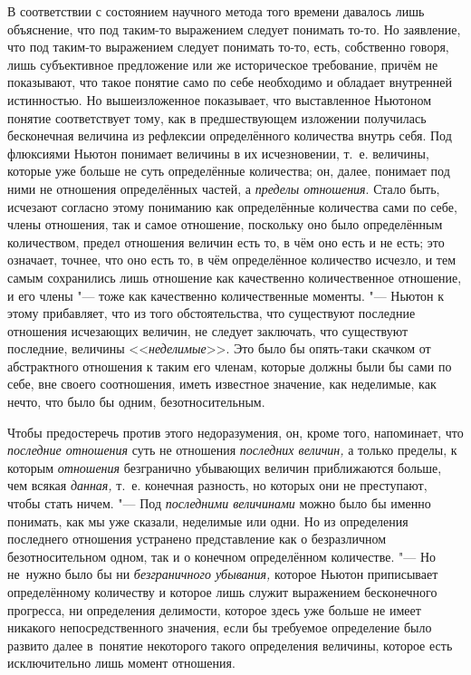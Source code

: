В соответствии с состоянием научного метода того времени давалось лишь
объяснение, что под таким-то выражением следует понимать то-то. Но заявление,
что под таким-то выражением следует понимать то-то, есть, собственно говоря,
лишь субъективное предложение или же историческое требование, причём не
показывают, что такое понятие само по себе необходимо и обладает внутренней
истинностью. Но вышеизложенное показывает, что выставленное Ньютоном понятие
соответствует тому, как в предшествующем изложении получилась бесконечная
величина из рефлексии определённого количества внутрь себя. Под флюксиями
Ньютон понимает величины в их исчезновении, т.~е. величины, которые уже больше
не суть определённые количества; он, далее, понимает под ними не отношения
определённых частей, а {\em пределы отношения}. Стало быть, исчезают согласно
этому пониманию как определённые количества сами по себе, члены отношения, так
и самое отношение, поскольку оно было определённым количеством, предел
отношения величин есть то, в чём оно есть и не есть; это означает, точнее, что
оно есть то, в чём определённое количество исчезло, и тем самым сохранились
лишь отношение как качественно количественное отношение, и его члены "--- тоже
как качественно количественные моменты. "--- Ньютон к этому прибавляет, что из
того обстоятельства, что существуют последние отношения исчезающих величин, не
следует заключать, что существуют последние, величины <<{\em неделимые}>>. Это
было бы опять-таки скачком от абстрактного отношения к таким его членам,
которые должны были бы сами по себе, вне своего соотношения, иметь известное
значение, как неделимые, как нечто, что было бы одним, безотносительным.

Чтобы предостеречь против этого недоразумения, он, кроме того, напоминает, что
{\em последние отношения} суть не отношения {\em последних величин,} а только
пределы, к которым {\em отношения} безгранично убывающих величин приближаются
больше, чем всякая {\em данная,} т.~е. конечная разность, но которых они не
преступают, чтобы стать ничем. "--- Под {\em последними величинами} можно было
бы именно понимать, как мы уже сказали, неделимые или одни. Но из определения
последнего отношения устранено представление как о безразличном
безотносительном одном, так и о конечном определённом количестве. "--- Но
не~нужно было бы ни {\em безграничного убывания,} которое Ньютон приписывает
определённому количеству и которое лишь служит выражением бесконечного
прогресса, ни определения делимости, которое здесь уже больше не имеет никакого
непосредственного значения, если бы требуемое определение было развито далее
в~понятие некоторого такого определения величины, которое есть исключительно
лишь момент отношения.

